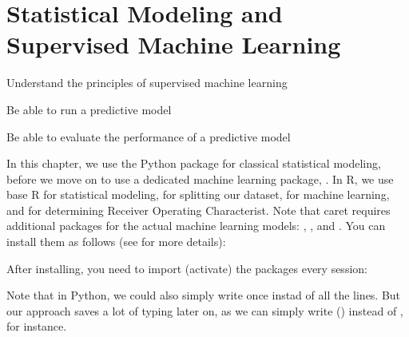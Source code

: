 \chapter{Statistical Modeling and Supervised Machine Learning}
\label{chap:introsml}

\begin{abstract}{Abstract} This chapter introduces the reader to the world of supervised machine learning. It starts by outlining how classical statistical techniques such as regression models can be used for prediction. It then provides an overview of frequently-used techniques from Na\"ive Bayes classifiers to neural networks.
\end{abstract}



\begin{objectives}
\item Understand the principles of supervised machine learning
\item Be able to run a predictive model
\item Be able to evaluate the performance of a predictive model
\end{objectives}

\newpage
\begin{feature}

In this chapter, we use the Python package  for classical statistical modeling, before we move on to use a dedicated machine learning package, . In R, we use base R for statistical modeling,  for splitting our dataset,  for machine learning, and  for determining Receiver Operating Characterist. Note that caret requires additional packages for the actual machine learning models: , , and . You can install them as follows (see  for more details):


\noindent After installing, you need to import (activate) the packages every session:


Note that in Python, we could also simply write  once instad of all the  lines. But our approach saves a lot of typing later on, as we can simply write () instead of , for instance.
\end{feature}





